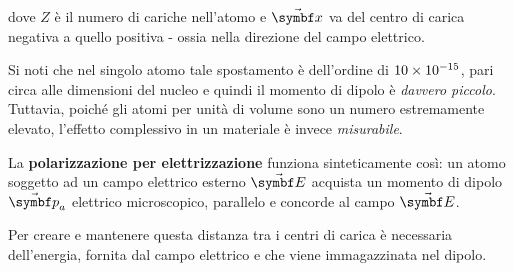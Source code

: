 dove $Z$ è il numero di cariche nell'atomo e $\vba{x}$ va del centro di carica negativa a quello positiva - ossia nella direzione del campo elettrico.
\begin{observe}
	Si noti che nel singolo atomo tale spostamento è dell'ordine di $\num{10d-15}$, pari circa alle dimensioni del nucleo e quindi il momento di dipolo è \textit{davvero piccolo}. Tuttavia, poiché gli atomi per unità di volume sono un numero estremamente elevato, l'effetto complessivo in un materiale è invece \textit{misurabile}.
\end{observe}
La \textbf{polarizzazione per elettrizzazione} funziona sinteticamente così: un atomo soggetto ad un campo elettrico esterno $\vba{E}$ acquista un momento di dipolo $\vba{p}_a$ elettrico microscopico, parallelo e concorde al campo $\vba{E}$.
\begin{observe}
	Per creare e mantenere questa distanza tra i centri di carica è necessaria dell'energia, fornita dal campo elettrico e che viene immagazzinata nel dipolo.
\end{observe}

